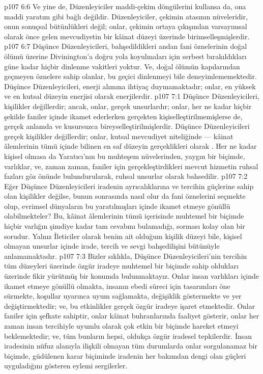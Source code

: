 \vs p107 6:6 Ve yine de, Düzenleyiciler maddi\hyp{}çekim döngülerini kullansa da, ona maddi yaratım gibi bağlı değildir. Düzenleyiciler, çekimin atasının nüveleridir, onun sonuçsal bütünlükleri değil; onlar, çekimin ortaya çıkışından varsayımsal olarak önce gelen mevcudiyetin bir kâinat düzeyi üzerinde birimselleşmişlerdir.
\vs p107 6:7 Düşünce Düzenleyicileri, bahşedildikleri andan fani öznelerinin doğal ölümü üzerine Divinington’a doğru yola koyulmaları için serbest bırakıldıkları güne kadar hiçbir dinlenme vakitleri yoktur. Ve, doğal ölümün kapılarından geçmeyen öznelere sahip olanlar, bu geçici dinlenmeyi bile deneyimlememektedir. Düşünce Düzenleyicileri, enerji alımına ihtiyaç duymamaktadır; onlar, en yüksek ve en kutsal düzeyin enerjisi olarak enerjilerdir.
\vs p107 7:1 Düşünce Düzenleyicileri, kişilikler değillerdir; ancak, onlar, gerçek unsurlardır; onlar, her ne kadar hiçbir şekilde faniler içinde ikamet ederlerken gerçekten kişiselleştirilmemişlerse de, gerçek anlamda ve kusursuzca bireyselleştirilmişlerdir. Düşünce Düzenleyicileri gerçek kişilikler değillerdir; onlar, kutsal mevcudiyet niteliğinde --- kâinat âlemlerinin tümü içinde bilinen en saf düzeyin gerçeklikleri olarak . Her ne kadar kişisel olmasa da Yaratıcı’nın bu muhteşem nüvelerinden, yaygın bir biçimde, varlıklar, ve, zaman zaman, faniler için gerçekleştirdikleri mevcut hizmetin ruhsal fazları göz önünde bulundurularak, ruhsal unsurlar olarak bahsedilir.
\vs p107 7:2 Eğer Düşünce Düzenleyicileri iradenin ayrıcalıklarına ve tercihin güçlerine sahip olan kişilikler değilse, bunun sonrasında nasıl olur da fani öznelerini seçmekte olup, evrimsel dünyaların bu yaratılmışları içinde ikamet etmeye gönüllü olabilmekteler? Bu, kâinat âlemlerinin tümü içerisinde muhtemel bir biçimde hiçbir varlığın şimdiye kadar tam cevabını bulamadığı, sorması kolay olan bir sorudur. Yalnız İleticiler olarak benim ait olduğum kişilik düzeyi bile, kişisel olmayan unsurlar içinde irade, tercih ve sevgi bahşedilişini bütünüyle anlamamaktadır.
\vs p107 7:3 Bizler sıklıkla, Düşünce Düzenleyicileri’nin tercihin tüm  düzeyleri üzerinde özgür iradeye muhtemel bir biçimde sahip oldukları üzerinde fikir yürütmüş bir konumda bulunmaktayız. Onlar insan varlıkları içinde ikamet etmeye gönüllü olmakta, insanın ebedi süreci için tasarımları öne sürmekte, koşullar uyarınca uyum sağlamakta, değişiklik göstermekte ve yer değiştirmektedir; ve, bu etkinlikler gerçek özgür iradeye işaret etmektedir. Onlar faniler için şefkate sahiptir, onlar kâinat buhranlarında faaliyet gösterir, onlar her zaman insan tercihiyle uyumlu olarak çok etkin bir biçimde hareket etmeyi beklemektedir; ve, tüm bunların hepsi, oldukça özgür iradesel tepkilerdir. İnsan iradesinin nüfuz alanıyla ilişkili olmayan tüm durumlarda onlar sorgulanamaz bir biçimde, güdülenen karar biçiminde iradenin her bakımdan dengi olan güçleri uyguladığını gösteren eylemi sergilerler.
